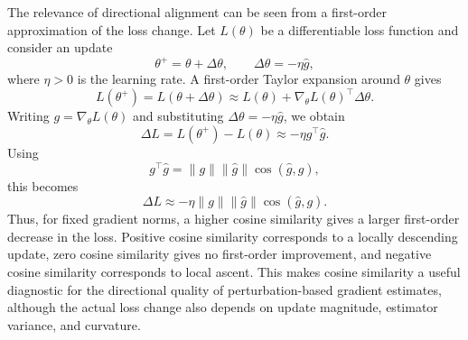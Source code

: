 The relevance of directional alignment can be seen from a first-order approximation of the loss change. Let \(L(\theta)\) be a differentiable loss function and consider an update
\[
\theta^+ = \theta + \Delta \theta,
\qquad
\Delta \theta = -\eta \widehat{g},
\]
where \(\eta > 0\) is the learning rate. A first-order Taylor expansion around \(\theta\) gives
\[
L(\theta^+) = L(\theta + \Delta \theta)
\approx
L(\theta) + \nabla_\theta L(\theta)^\top \Delta \theta.
\]
Writing \(g=\nabla_\theta L(\theta)\) and substituting \(\Delta \theta=-\eta\widehat{g}\), we obtain
\[
\Delta L
=
L(\theta^+) - L(\theta)
\approx
-\eta g^\top \widehat{g}.
\]
Using
\[
g^\top \widehat{g}
=
\|g\|\|\widehat{g}\|\cos(\widehat{g},g),
\]
this becomes
\[
\Delta L
\approx
-\eta \|g\|\|\widehat{g}\|\cos(\widehat{g},g).
\]
Thus, for fixed gradient norms, a higher cosine similarity gives a larger first-order decrease in the loss. Positive cosine similarity corresponds to a locally descending update, zero cosine similarity gives no first-order improvement, and negative cosine similarity corresponds to local ascent. This makes cosine similarity a useful diagnostic for the directional quality of perturbation-based gradient estimates, although the actual loss change also depends on update magnitude, estimator variance, and curvature.

